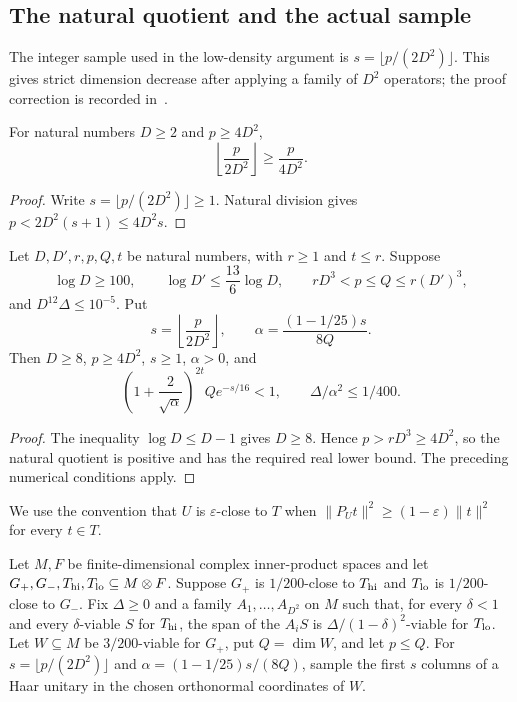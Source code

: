 \subsection{The natural quotient and the actual sample}

The integer sample used in the low-density argument is
$s=\lfloor p/(2D^2)\rfloor$. This gives strict dimension decrease after
applying a family of $D^2$ operators; the proof correction is recorded
in~\cite{gap:alvv16_low_density_sampling}.

\begin{lemma}
    \label{lem:nested_integer_sample_floor}
    \leanok
    For natural numbers $D\ge2$ and $p\ge4D^2$,
    \[
        \left\lfloor\frac{p}{2D^2}\right\rfloor\ge\frac{p}{4D^2}.
    \]
\end{lemma}
\begin{proof}\leanok
    Write $s=\lfloor p/(2D^2)\rfloor\ge1$.
    Natural division gives $p<2D^2(s+1)\le4D^2s$.
\end{proof}

\begin{lemma}
    \label{lem:nested_sampling_natural_conditions}
    \leanok
    Let $D,D',r,p,Q,t$ be natural numbers, with $r\ge1$ and $t\le r$.
    Suppose
    \[
        \log D\ge100,\qquad \log D'\le\frac{13}{6}\log D,
        \qquad rD^3<p\le Q\le r(D')^3,
    \]
    and $D^{12}\Delta\le10^{-5}$. Put
    \[
        s=\left\lfloor\frac{p}{2D^2}\right\rfloor,
        \qquad \alpha=\frac{(1-1/25)s}{8Q}.
    \]
    Then $D\ge8$, $p\ge4D^2$, $s\ge1$, $\alpha>0$, and
    \[
        \left(1+\frac2{\sqrt\alpha}\right)^{2t}Qe^{-s/16}<1,
        \qquad \Delta/\alpha^2\le1/400.
    \]
\end{lemma}
\begin{proof}\leanok
    The inequality $\log D\le D-1$ gives $D\ge8$.
    Hence $p>rD^3\ge4D^2$, so the natural quotient is positive and has
    the required real lower bound. The preceding numerical conditions apply.
\end{proof}

We use the convention that $U$ is $\varepsilon$-close to $T$ when
$\|P_Ut\|^2\ge(1-\varepsilon)\|t\|^2$ for every $t\in T$.

Let $M,F$ be finite-dimensional complex inner-product spaces and let
$G_+,G_-,T_{\rm hi},T_{\rm lo}\subseteq M\otimes F$.
Suppose $G_+$ is $1/200$-close to $T_{\rm hi}$ and $T_{\rm lo}$ is
$1/200$-close to $G_-$. Fix $\Delta\ge0$ and a family
$A_1,\ldots,A_{D^2}$ on $M$ such that, for every $\delta<1$ and every
$\delta$-viable $S$ for $T_{\rm hi}$, the span of the $A_iS$ is
$\Delta/(1-\delta)^2$-viable for $T_{\rm lo}$.
Let $W\subseteq M$ be $3/200$-viable for $G_+$, put $Q=\dim W$, and let
$p\le Q$. For $s=\lfloor p/(2D^2)\rfloor$ and
$\alpha=(1-1/25)s/(8Q)$, sample the first $s$ columns of a Haar unitary
in the chosen orthonormal coordinates of $W$.

